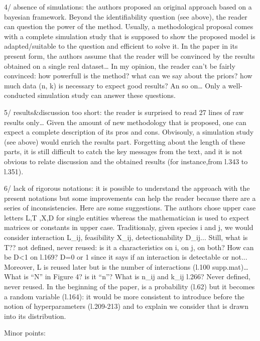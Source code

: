 \documentclass[12pt]{letter}
\newenvironment{refquote}{\bigskip \begin{it}}{\end{it}\smallskip}
\begin{document}
\begin{refquote}
	4/ absence of simulations: the authors proposed an original approach based on a bayesian framework. Beyond the identifiability question (see above), the reader can question the power of the method. Usually, a methodological proposal comes with a complete simulation study that is supposed to show  the proposed model is adapted/suitable to the question and efficient to solve it. In the paper in its present form, the authors assume that the reader will be convinced by the results obtained on a single real dataset… In my opinion, the reader can’t be fairly convinced: how powerfull is the method? what can we say about the priors? how much data (n, k) is necessary to expect good results? An so on… Only a well-conducted simulation study can answer these questions.

	5/ results&discussion too short: the reader is surprised to read 27 lines of raw results only… Given the amount of new methodology that is proposed, one can expect a complete description of its pros and cons. Obvisouly, a simulation study (see above) would enrich the results part. Forgetting about the length of these parts, it is still difficult to catch the key messages from the text, and it is not obvious to relate discussion and the obtained results (for instance,from l.343 to l.351).

	6/ lack of rigorous notations: it is possible to understand the approach with the present notations but some improvements can help the reader because there are a series of inconsistencies. Here are some suggestions. The authors chose upper case letters L,T ,X,D for single entities whereas the mathematician is used to expect matrices or constants in upper case. Traditionaly, given species i and j, we would consider interaction L_ij, feasibility X_ij, detectionability D_ij...
	Still, what is T?? not defined, never reused: is it a characteristics on i, on j, on both?
	How can be D<1 on l.169? D=0 or 1 since it says if an interaction is detectable or not...
	Moreover, L is reused later but is the number of interactions (l.100 supp.mat)…
	What is “N” in Figure 4? is it “n”? What is n_ij and k_ij l.266? Never defined, never reused.
	In the beginning of the paper, \lambda is a probability (l.62) but it becomes a random variable (l.164): it would be more consistent to introduce before the notion of hyperparameters  (l.209-213) and to explain we consider that \lambda is drawn into its distribution.

	\end{refquote}

	Minor points:
\end{document}
